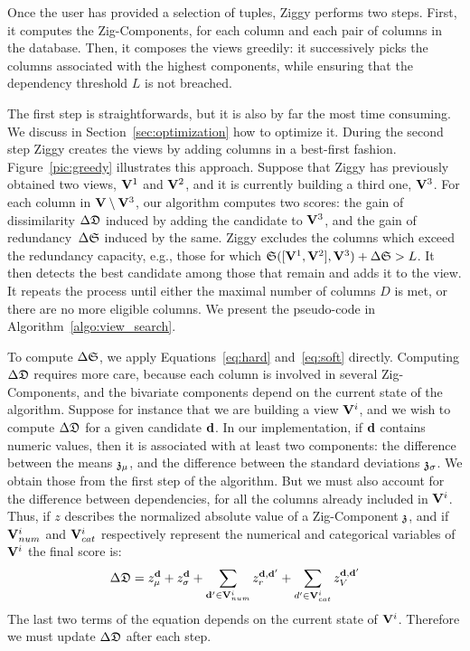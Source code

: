 Once the user has provided a selection of tuples, Ziggy performs two steps.
First, it computes the Zig-Components, for each column and each pair of columns
in the database. Then, it composes the views greedily: it successively picks
the co\-lumns associated with the highest components, while ensuring that the
dependency threshold $L$ is not breached.

The first step is straightforwards, but it is also by far the most time
consuming. We discuss in Section~\ref{sec:optimization} how to optimize it.
During the second step Ziggy creates the views by adding columns in a
best-first fashion.  Figure~\ref{pic:greedy} illustrates this approach. Suppose
that Ziggy has previously obtained two views, $\mathbf{V}^1$ and $\mathbf{V}^2$, and it
is currently building a third one, $\mathbf{V}^3$. For each column in $\mathbf{V}
\setminus \mathbf{V}^3 $, our algorithm computes two scores: the gain of
dissimilarity $\Delta\mathfrak{D}$ induced by adding the candidate to $\mathbf{V}^3$, and
the gain of redundancy~$\Delta\mathfrak{S}$ induced by the same. Ziggy excludes the
columns which exceed the redundancy capacity, e.g., those for which
$\mathfrak{S}([\mathbf{V}^1, \mathbf{V}^2], \mathbf{V}^3) + \Delta\mathfrak{S} > L$. It then detects
the best candidate among those that remain and adds it to the view. It repeats the
process until either the maximal number of columns $D$ is met, or there are no
more eligible columns. We present the pseudo-code in
Algorithm~\ref{algo:view_search}.

To compute $\Delta\mathfrak{S}$, we apply Equations~\ref{eq:hard} and~\ref{eq:soft}
directly. Computing $\Delta\mathfrak{D}$ requires more care, because each column is
involved in several Zig-Com\-po\-nents, and the bivariate components
depend on the current state of the algorithm.  Suppose for instance that we are
building a view $\mathbf{V}^{i}$, and we wish to compute $\Delta\mathfrak{D}$ for a given
candidate $\bf{d}$.  In our implementation, if $\bf{d}$ contains numeric
values, then it is associated with at least two components: the difference
between the means $\mathfrak{z}_\mu$, and the difference between the standard
deviations $\mathfrak{z}_\sigma$. We obtain those from the first step of the
algorithm.  But we must also account for the difference between dependencies,
for all the columns already included in $\mathbf{V}^{i}$. Thus, if $z$ describes
the normalized absolute value of a Zig-Component $\mathfrak{z}$, and if
$\mathbf{V}^{i}_{num}$ and $\mathbf{V}^{i}_{cat}$ respectively represent the numerical
and categorical variables of $\mathbf{V}^{i}$ the final score is:
    \begin{multline}
\Delta\mathfrak{D} = 
z_\mu^{\bf{d}}+ z_\sigma^{\bf{d}} +
\sum_{\mathbf{d}' \in \mathbf{V}^i_{num}} z_r^{\mathbf{d}, \mathbf{d}'}
+ \sum_{d' \in \mathbf{V}^i_{cat}} z_V^{\mathbf{d}, \mathbf{d}'}
\end{multline}
The last two terms of the equation depends on the current state of $ \mathbf{V}^i$.
Therefore we must update $\Delta\mathfrak{D}$ after each step.

